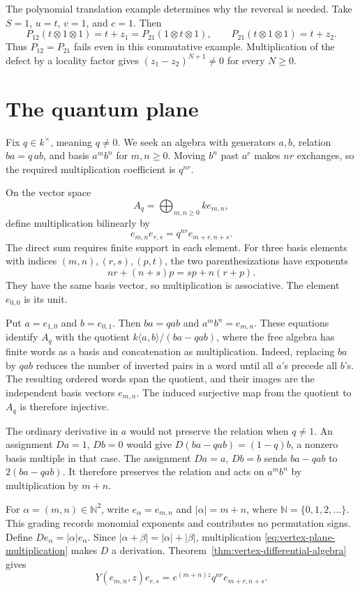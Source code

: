 The polynomial translation example determines why the reversal is needed.
Take $S=1$, $u=t$, $v=1$, and $c=1$.
Then
\[
 P_{12}(t\otimes1\otimes1)=t+z_1
   =P_{21}(1\otimes t\otimes1),
 \qquad P_{21}(t\otimes1\otimes1)=t+z_2.
\]
Thus $P_{12}=P_{21}$ fails even in this commutative example.
Multiplication of the defect by a locality factor gives
$(z_1-z_2)^{N+1}\ne0$ for every $N\geq0$.

\section{The quantum plane}
\label{sec:vertex-quantum-plane}

Fix $q\in k^\times$, meaning $q\ne0$.
We seek an algebra with generators $a,b$, relation $ba=q\,ab$,
and basis $a^mb^n$ for $m,n\geq0$.
Moving $b^n$ past $a^r$ makes $nr$ exchanges, so the required
multiplication coefficient is $q^{nr}$.

On the vector space
\[
 A_q=\bigoplus_{m,n\geq0}k e_{m,n},
\]
define multiplication bilinearly by
\begin{equation}\label{eq:vertex-plane-multiplication}
 e_{m,n}e_{r,s}=q^{nr}e_{m+r,n+s}.
\end{equation}
The direct sum requires finite support in each element.
For three basis elements with indices $(m,n),(r,s),(p,t)$,
the two parenthesizations have exponents
\[
 nr+(n+s)p=sp+n(r+p).
\]
They have the same basis vector, so multiplication is associative.
The element $e_{0,0}$ is its unit.

Put $a=e_{1,0}$ and $b=e_{0,1}$.
Then $ba=q ab$ and $a^mb^n=e_{m,n}$.
These equations identify $A_q$ with the quotient
$k\langle a,b\rangle/(ba-qab)$, where the free algebra has finite
words as a basis and concatenation as multiplication.
Indeed, replacing $ba$ by $qab$ reduces the number of inverted
pairs in a word until all $a$'s precede all $b$'s.
The resulting ordered words span the quotient, and their images
are the independent basis vectors $e_{m,n}$.
The induced surjective map from the quotient to $A_q$ is therefore injective.

The ordinary derivative in $a$ would not preserve the relation
when $q\ne1$.
An assignment $Da=1$, $Db=0$ would give
$D(ba-qab)=(1-q)b$, a nonzero basis multiple in that case.
The assignment $Da=a$, $Db=b$ sends $ba-qab$ to $2(ba-qab)$.
It therefore preserves the relation and acts on $a^mb^n$ by
multiplication by $m+n$.

For $\alpha=(m,n)\in\mathbb N^2$, write $e_\alpha=e_{m,n}$
and $|\alpha|=m+n$, where $\mathbb N=\{0,1,2,\ldots\}$.
This grading records monomial exponents and contributes no permutation signs.
Define $De_\alpha=|\alpha|e_\alpha$.
Since $|\alpha+\beta|=|\alpha|+|\beta|$, multiplication
\eqref{eq:vertex-plane-multiplication} makes $D$ a derivation.
Theorem~\ref{thm:vertex-differential-algebra} gives
\begin{equation}\label{eq:vertex-plane-field}
 Y(e_{m,n},z)e_{r,s}
   =e^{(m+n)z}q^{nr}e_{m+r,n+s}.
\end{equation}

